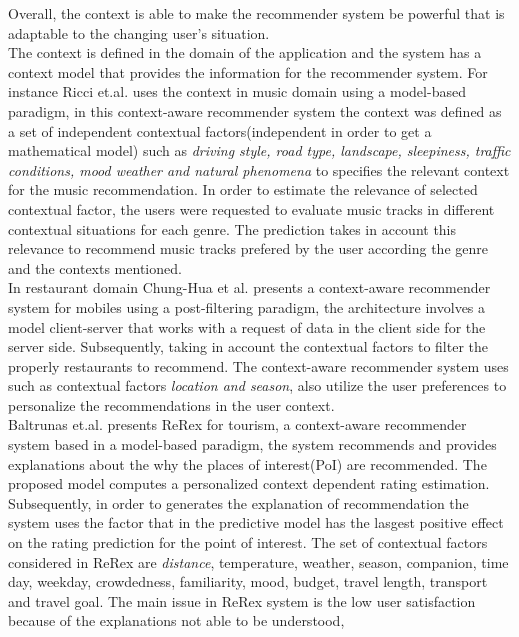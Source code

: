 Overall, the context is able to make the recommender system be 
powerful that is adaptable to the changing user's situation.\\
The context is defined in the domain of the application and the system
has a context model that provides the information for the recommender
system. For instance Ricci et.al. \cite{baltrunas2011incarmusic} uses
the context in music domain using a model-based paradigm, in this
context-aware recommender system the context was defined as a set of
independent contextual factors(independent in order to get a
mathematical model) such as \textit{driving style, road type,
landscape, sleepiness, traffic conditions, mood weather and natural
phenomena} to specifies the relevant context for the music
recommendation. In order to estimate the relevance of selected
contextual factor, the users were requested to evaluate music tracks
in different contextual situations for each genre. The prediction
takes in account this relevance to recommend music tracks prefered by
the user according the genre and the contexts mentioned.\\ In
restaurant domain Chung-Hua et al.\cite{chu2013chinese} presents a
context-aware recommender system for mobiles using a post-filtering
paradigm, the architecture involves a model client-server that works
with a request of data in the client side for the server side.
Subsequently, taking in account the contextual factors to filter the
properly restaurants to recommend. The context-aware recommender
system uses such as contextual factors \textit{location and season}, 
also utilize the user preferences to personalize the recommendations
in the user context.\\ 
Baltrunas et.al.\cite{baltrunas2011context} presents ReRex for tourism, 
a context-aware recommender system based in a model-based paradigm, the system
recommends and provides explanations about the why the places of
interest(PoI) are recommended. The proposed model computes a
personalized context dependent rating estimation. Subsequently, in
order to generates the explanation of recommendation the system uses
the factor that in the predictive model has the lasgest positive
effect on the rating prediction for the point of interest. The set of
contextual factors considered in ReRex are \textit{distance},
temperature, weather, season, companion, time day, weekday,
crowdedness, familiarity, mood, budget, travel length, transport and
travel goal. The main issue in ReRex system is the low user
satisfaction because of the explanations not able to be understood,
